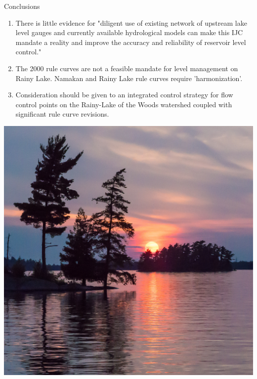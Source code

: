 \documentclass[compress,english]{beamer}
\begin{document}
{{{{{{\begin{frame}{Conclusions}
\begin{enumerate}

\item There is little evidence for "diligent use of existing network of upstream lake level gauges and currently available hydrological models can make this IJC mandate a reality and improve the accuracy and reliability of reservoir level control."

\item The 2000 rule curves are not a feasible mandate for level management on Rainy Lake. Namakan and Rainy Lake rule curves require 'harmonization'.

\item  Consideration should be given to an integrated control strategy for flow control points on the Rainy-Lake of the Woods watershed coupled with significant rule curve revisions.
	
\end{enumerate}

\end{frame}



{\usebackgroundtemplate%
	{\includegraphics[width=\paperwidth]{FloodedSunset}}
}}}}}}}
\end{document}
